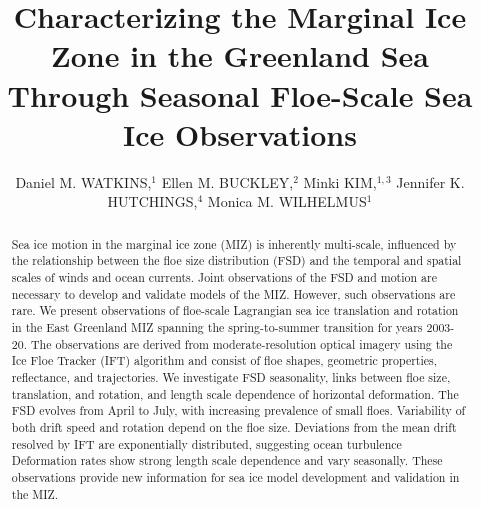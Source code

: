 \documentclass[review, jog]{igs}
\begin{document}
\title[Floe-scale sea ice motion]{Characterizing the Marginal Ice Zone in the Greenland Sea Through Seasonal Floe-Scale Sea Ice Observations}

\author[Watkins and others]{Daniel M. WATKINS,$^1$ 
  Ellen M. BUCKLEY,$^2$ Minki KIM,$^{1,3}$ 
  Jennifer K. HUTCHINGS,$^4$
  Monica M. WILHELMUS$^1$}


\begin{frontmatter}
\maketitle

\begin{abstract}
Sea ice motion in the marginal ice zone (MIZ) is inherently multi-scale, influenced by the relationship between the floe size distribution (FSD) and the temporal and spatial scales of winds and ocean currents. Joint observations of the FSD and motion are necessary to develop and validate models of the MIZ. However, such observations are rare.
We present observations of floe-scale Lagrangian sea ice translation and rotation in the East Greenland MIZ spanning the spring-to-summer transition for years 2003-20.
The observations are derived from moderate-resolution optical imagery using the Ice Floe Tracker (IFT) algorithm and consist of floe shapes, geometric properties, reflectance, and trajectories. We investigate FSD seasonality, links between floe size, translation, and rotation, and length scale dependence of horizontal deformation. The FSD evolves from April to July, with increasing prevalence of small floes. Variability of both drift speed and rotation depend on the floe size. Deviations from the mean drift resolved by IFT are exponentially distributed, suggesting  ocean turbulence 
Deformation rates show strong length scale dependence and vary seasonally. These observations provide new information for sea ice model development and validation in the MIZ.
\end{abstract}
\end{frontmatter}
\end{document}
